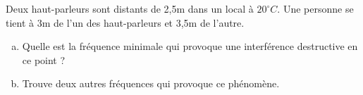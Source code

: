 %
%
    Deux haut-parleurs sont distants de 2,5m dans un local à \(20 ^ \circ C\). Une personne se tient à 3m de l'un des haut-parleurs et 3,5m de l'autre.
    \begin{enumerate}[a)]
        \item Quelle est la fréquence minimale qui provoque une interférence destructive en ce point ?
        \item Trouve deux autres fréquences qui provoque ce phénomène.
    \end{enumerate}
